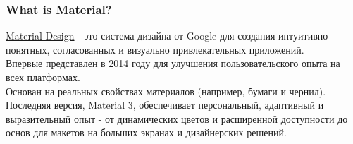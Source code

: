 \documentclass[12pt]{beamer}
\begin{document}
\begin{frame}
\begin{columns}
\begin{column}{0.3\textwidth}
            \end{column}
        \end{columns}
    \end{frame}

	\begin{frame}
		\frametitle{What is Material?}
		\href{https://m3.material.io/}{Material Design}
        - это система дизайна от Google
        для создания интуитивно понятных,
        согласованных и визуально привлекательных приложений. \\
		
        Впервые представлен в 2014 году для
        улучшения пользовательского опыта на всех платформах. \\

        Основан на реальных свойствах материалов
        (например, бумаги и чернил). \\

		Последняя версия, Material 3,
        обеспечивает персональный, адаптивный
        и выразительный опыт - от динамических цветов
        и расширенной доступности до основ
        для макетов на больших экранах и дизайнерских решений.	
	\end{frame}
	
\end{document}
